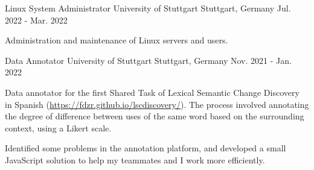 \begin{cventries}
  \cventry
    {Linux System Administrator} %
    {University of Stuttgart} %
    {Stuttgart, Germany} %
    {Jul. 2022 - Mar. 2022} %
    {
      \begin{cvitems} %
        \item {Administration and maintenance of Linux servers and users.}
      \end{cvitems}
    }

  \cventry
    {Data Annotator} %
    {University of Stuttgart} %
    {Stuttgart, Germany} %
    {Nov. 2021 - Jan. 2022} %
    {
      \begin{cvitems} %
        \item {Data annotator for the first Shared Task of Lexical Semantic Change Discovery in Spanish (\url{https://fdzr.github.io/lscdiscovery/}). The process involved annotating the degree of difference between uses of the same word based on the surrounding context, using a Likert scale.}
		\item{Identified some problems in the annotation platform, and developed a small JavaScript solution to help my teammates and I work more efficiently.}
      \end{cvitems}
    }




\end{cventries}
